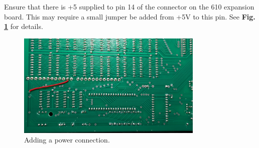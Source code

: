 Ensure that there is +5 supplied to pin 14 of the connector on the 610 expansion board. This may require a small jumper be added from +5V to this pin. See \textbf{Fig. \ref{fig:powerjumper}} for details.

\begin{figure}[htbp]
\begin{center}
\includegraphics[width=3.5in]{images/PowerJumper}
\caption{Adding a power connection.}
\label{fig:powerjumper}
\end{center}
\end{figure}

